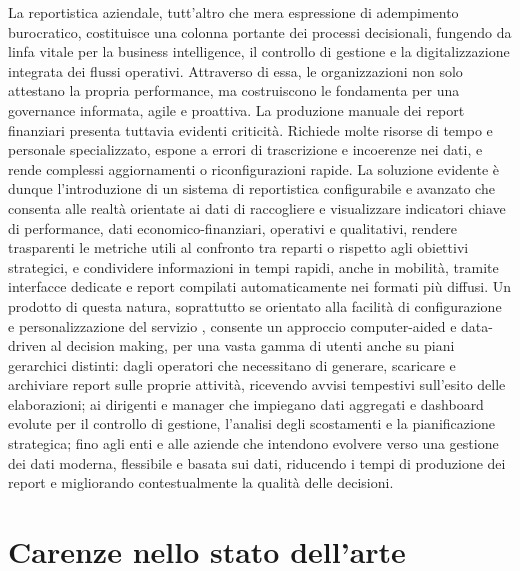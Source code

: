 La reportistica aziendale, tutt'altro che mera espressione di adempimento burocratico, costituisce una colonna portante dei processi decisionali, fungendo da linfa vitale per la business intelligence, il controllo di gestione e la digitalizzazione integrata dei flussi operativi.
Attraverso di essa, le organizzazioni non solo attestano la propria performance, ma costruiscono le fondamenta per una governance informata, agile e proattiva.
La produzione manuale dei report finanziari presenta tuttavia evidenti criticità. Richiede molte risorse di tempo e personale specializzato, espone a errori di trascrizione e incoerenze nei dati, e rende complessi aggiornamenti o riconfigurazioni rapide.
La soluzione evidente è dunque l'introduzione di un sistema di reportistica configurabile e avanzato che consenta alle realtà orientate ai dati di raccogliere e visualizzare indicatori chiave di performance, dati economico-finanziari, operativi e qualitativi, rendere trasparenti le metriche utili al confronto tra reparti o rispetto agli obiettivi strategici, e condividere informazioni in tempi rapidi, anche in mobilità, tramite interfacce dedicate e report compilati automaticamente nei formati più diffusi.
Un prodotto di questa natura, soprattutto se orientato alla facilità di configurazione e personalizzazione del servizio \footnotemark, consente un approccio computer-aided e data-driven al decision making, per una vasta gamma di utenti anche su piani gerarchici distinti: dagli operatori che necessitano di generare, scaricare e archiviare report sulle proprie attività, ricevendo avvisi tempestivi sull’esito delle elaborazioni; ai dirigenti e manager che impiegano dati aggregati e dashboard evolute per il controllo di gestione, l’analisi degli scostamenti e la pianificazione strategica; fino agli enti e alle aziende che intendono evolvere verso una gestione dei dati moderna, flessibile e basata sui dati, riducendo i tempi di produzione dei report e migliorando contestualmente la qualità delle decisioni.


\section{Carenze nello stato dell'arte}

